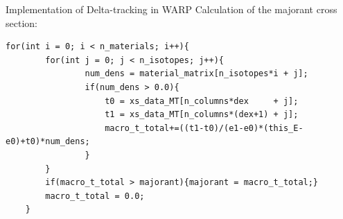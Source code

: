 \documentclass[xcolor=x11names, compress, handout]{beamer}
\renewcommand{\(}{\begin{columns}}
\renewcommand{\)}{\end{columns}}
\newcommand{\<}[1]{\begin{column}{#1}}
\renewcommand{\>}{\end{column}}
\begin{document}
%
%
%
%
%

\begin{frame}[fragile]{Implementation of Delta-tracking in WARP}
	Calculation of the majorant cross section:
	\vspace{5 mm}
	\pause
	\begin{Verbatim}[fontsize=\footnotesize]
	for(int i = 0; i < n_materials; i++){
	    for(int j = 0; j < n_isotopes; j++){
	            num_dens = material_matrix[n_isotopes*i + j];
	            if(num_dens > 0.0){
	                t0 = xs_data_MT[n_columns*dex     + j];
	                t1 = xs_data_MT[n_columns*(dex+1) + j];
	                macro_t_total+=((t1-t0)/(e1-e0)*(this_E-e0)+t0)*num_dens;
	            }
	    }
	    if(macro_t_total > majorant){majorant = macro_t_total;}
	    macro_t_total = 0.0;
	}
	\end{Verbatim}
\end{frame}
\end{document}

